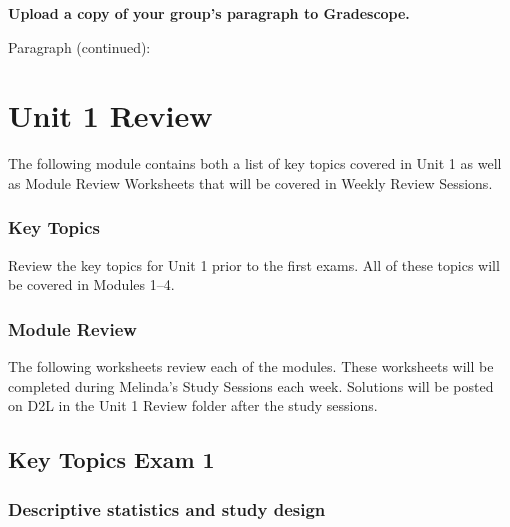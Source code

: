 \documentclass[
]{report}
\begin{document}
\textbf{Upload a copy of your group's paragraph to Gradescope.}

\newpage

Paragraph (continued):

\newpage

\chapter{Unit 1 Review}\label{unit-1-review}

The following module contains both a list of key topics covered in Unit 1 as well as Module Review Worksheets that will be covered in Weekly Review Sessions.

\subsection{Key Topics}\label{key-topics-4}

Review the key topics for Unit 1 prior to the first exams. All of these topics will be covered in Modules 1--4.

\subsection{Module Review}\label{module-review}


The following worksheets review each of the modules. These worksheets will be completed during Melinda's Study Sessions each week. Solutions will be posted on D2L in the Unit 1 Review folder after the study sessions.

\newpage

\section{Key Topics Exam 1}\label{key-topics-exam-1}

\subsection*{Descriptive statistics and study design}\label{descriptive-statistics-and-study-design}
\end{document}
